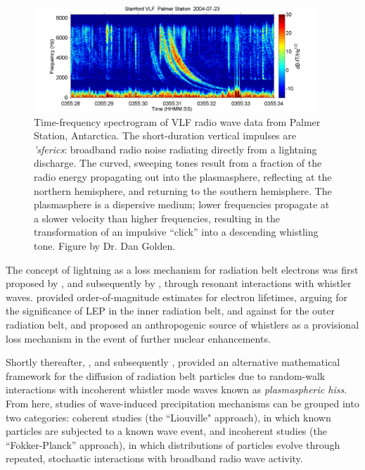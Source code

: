 \begin{figure}[t]
\begin{center}
\includegraphics[width=0.95\textwidth]{figures/Whistler_radio_palmer_2004-07-23_T035528.png}

\caption[An example of a lightning-generated whistler wave]{Time-frequency spectrogram of VLF radio wave data from Palmer Station, Antarctica. The short-duration vertical impulses are \emph{'sferics}: broadband radio noise radiating directly from a lightning discharge. The curved, sweeping tones result from a fraction of the radio energy propagating out into the plasmasphere, reflecting at the northern hemisphere, and returning to the southern hemisphere. The plasmasphere is a dispersive medium; lower frequencies propagate at a slower velocity than higher frequencies, resulting in the transformation of an impulsive ``click'' into a descending whistling tone. Figure by Dr. Dan Golden.\footnotemark[2] }
\label{fig:whistlers}
\end{center}
\end{figure}

The concept of lightning as a loss mechanism for radiation belt electrons was first proposed by \cite{Dungey1963}, and subsequently by \cite{Cornwall1964}, through resonant interactions with whistler waves. \citeauthor{Dungey1963} provided order-of-magnitude estimates for electron lifetimes, arguing for the significance of LEP in the inner radiation belt, and against for the outer radiation belt, and proposed an anthropogenic source of whistlers as a provisional loss mechanism in the event of further nuclear enhancements. 

Shortly thereafter, \cite{Kennel1966b}, and subsequently \cite{Lyons1973}, provided an alternative mathematical framework for the diffusion of radiation belt particles due to random-walk interactions with incoherent whistler mode waves known as \emph{plasmaspheric hiss}. From here, studies of wave-induced precipitation mechanisms can be grouped into two categories: coherent studies (the ``Liouville" approach), in which known particles are subjected to a known wave event, and incoherent studies (the ``Fokker-Planck'' approach), in which distributions of particles evolve through repeated, stochastic interactions with broadband radio wave activity.

